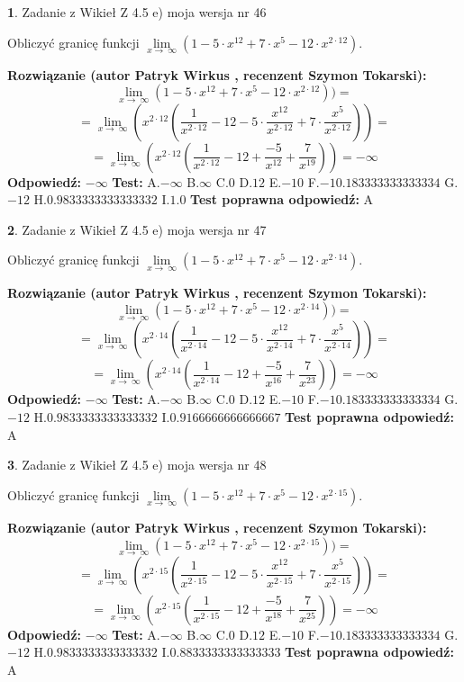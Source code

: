 \documentclass[12pt, a4paper]{article}
\theoremstyle{definition} %
\newtheorem{zad}{}
\newcommand{\zadStart}[1]{\begin{zad}#1\newline}
\newcommand{\zadStop}{\end{zad}}
\newcommand{\rozwStart}[2]{\noindent \textbf{Rozwiązanie (autor #1 , recenzent #2): }\newline}
\newcommand{\rozwStop}{\newline}
\newcommand{\odpStart}{\noindent \textbf{Odpowiedź:}\newline}
\newcommand{\odpStop}{\newline}
\newcommand{\testStart}{\noindent \textbf{Test:}\newline}
\newcommand{\testStop}{\newline}
\newcommand{\kluczStart}{\noindent \textbf{Test poprawna odpowiedź:}\newline}
\newcommand{\kluczStop}{\newline}
\begin{document}
\zadStart{Zadanie z Wikieł Z 4.5 e) moja wersja nr 46}


Obliczyć granicę funkcji  $\lim\limits_{x\to\ \infty}(1 - 5 \cdot x^{12}+7 \cdot x^{5}- 12 \cdot x^{2\cdot12})$.
\zadStop
\rozwStart{Patryk Wirkus}{Szymon Tokarski}
$$\lim\limits_{x\to\ \infty}(1 - 5 \cdot x^{12}+7 \cdot x^{5}- 12 \cdot x^{2\cdot12}))=$$
$$=\lim\limits_{x\to\ \infty}(x^{2\cdot12}(\frac{1}{x^{2\cdot12}}-12 -5 \cdot \frac{x^{12}}{x^{2\cdot12}}+7 \cdot \frac{x^{5}}{x^{2\cdot12}}))=$$
$$=\lim\limits_{x\to\ \infty}(x^{2\cdot12}(\frac{1}{x^{2\cdot12}}-12 + \frac{-5}{x^{12}}+ \frac{7}{x^{19}}))=-\infty$$
\rozwStop
\odpStart
$-\infty$
\odpStop
\testStart
A.$-\infty$ B.$\infty$ C.$0$ D.$12$ E.$-10$
F.$-10.183333333333334$ G.$-12$
H.$0.9833333333333332$
I.$1.0$
\testStop
\kluczStart
A
\kluczStop



\zadStart{Zadanie z Wikieł Z 4.5 e) moja wersja nr 47}


Obliczyć granicę funkcji  $\lim\limits_{x\to\ \infty}(1 - 5 \cdot x^{12}+7 \cdot x^{5}- 12 \cdot x^{2\cdot14})$.
\zadStop
\rozwStart{Patryk Wirkus}{Szymon Tokarski}
$$\lim\limits_{x\to\ \infty}(1 - 5 \cdot x^{12}+7 \cdot x^{5}- 12 \cdot x^{2\cdot14}))=$$
$$=\lim\limits_{x\to\ \infty}(x^{2\cdot14}(\frac{1}{x^{2\cdot14}}-12 -5 \cdot \frac{x^{12}}{x^{2\cdot14}}+7 \cdot \frac{x^{5}}{x^{2\cdot14}}))=$$
$$=\lim\limits_{x\to\ \infty}(x^{2\cdot14}(\frac{1}{x^{2\cdot14}}-12 + \frac{-5}{x^{16}}+ \frac{7}{x^{23}}))=-\infty$$
\rozwStop
\odpStart
$-\infty$
\odpStop
\testStart
A.$-\infty$ B.$\infty$ C.$0$ D.$12$ E.$-10$
F.$-10.183333333333334$ G.$-12$
H.$0.9833333333333332$
I.$0.9166666666666667$
\testStop
\kluczStart
A
\kluczStop



\zadStart{Zadanie z Wikieł Z 4.5 e) moja wersja nr 48}


Obliczyć granicę funkcji  $\lim\limits_{x\to\ \infty}(1 - 5 \cdot x^{12}+7 \cdot x^{5}- 12 \cdot x^{2\cdot15})$.
\zadStop
\rozwStart{Patryk Wirkus}{Szymon Tokarski}
$$\lim\limits_{x\to\ \infty}(1 - 5 \cdot x^{12}+7 \cdot x^{5}- 12 \cdot x^{2\cdot15}))=$$
$$=\lim\limits_{x\to\ \infty}(x^{2\cdot15}(\frac{1}{x^{2\cdot15}}-12 -5 \cdot \frac{x^{12}}{x^{2\cdot15}}+7 \cdot \frac{x^{5}}{x^{2\cdot15}}))=$$
$$=\lim\limits_{x\to\ \infty}(x^{2\cdot15}(\frac{1}{x^{2\cdot15}}-12 + \frac{-5}{x^{18}}+ \frac{7}{x^{25}}))=-\infty$$
\rozwStop
\odpStart
$-\infty$
\odpStop
\testStart
A.$-\infty$ B.$\infty$ C.$0$ D.$12$ E.$-10$
F.$-10.183333333333334$ G.$-12$
H.$0.9833333333333332$
I.$0.8833333333333333$
\testStop
\kluczStart
A
\kluczStop
\end{document}
